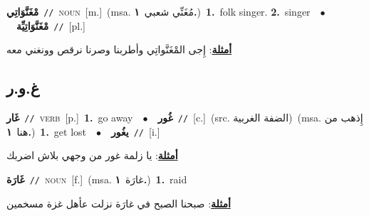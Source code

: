 \documentclass[10pt,a4paper,twoside]{article} %
\begin{document}
\begin{multicols}{2}
{\setlength\topsep{0pt}\textbf{\foreignlanguage{arabic}{مْغَنَّوَاتِي}}\ {\color{gray}\texttt{//}\color{black}}\ \textsc{noun}\ [m.]\ \color{gray}(msa. \foreignlanguage{arabic}{مُغَنِّي شعبي}~\foreignlanguage{arabic}{\textbf{١.}})\color{black}\ \textbf{1.}~folk singer.  \textbf{2.}~singer\ \ $\bullet$\ \ \setlength\topsep{0pt}\textbf{\foreignlanguage{arabic}{مْغَنَّوَاتِيِّة}}\ {\color{gray}\texttt{//}\color{black}}\ [pl.]\  \begin{flushright}\color{gray}\foreignlanguage{arabic}{\textbf{\underline{\foreignlanguage{arabic}{أمثلة}}}: إِجى المْغَنَّواتِي وأطربنا وصرنا نرقص وونغني معه}\end{flushright}\color{black}} \vspace{2mm}

\vspace{-3mm}
\subsection*{\color{blue}\foreignlanguage{arabic}{غ.و.ر}\color{blue}{}} 

{\setlength\topsep{0pt}\textbf{\foreignlanguage{arabic}{غَار}}\ {\color{gray}\texttt{//}\color{black}}\ \textsc{verb}\ [p.]\ \textbf{1.}~go away\ \ $\bullet$\ \ \setlength\topsep{0pt}\textbf{\foreignlanguage{arabic}{غُور}}\ {\color{gray}\texttt{//}\color{black}}\ [c.]\ (src. \color{gray}\foreignlanguage{arabic}{الضفة الغربية}\color{black})\ \color{gray}(msa. \foreignlanguage{arabic}{إِذهب من هنا}~\foreignlanguage{arabic}{\textbf{١.}})\color{black}\ \textbf{1.}~get lost\ \ $\bullet$\ \ \setlength\topsep{0pt}\textbf{\foreignlanguage{arabic}{يغُور}}\ {\color{gray}\texttt{//}\color{black}}\ [i.]\  \begin{flushright}\color{gray}\foreignlanguage{arabic}{\textbf{\underline{\foreignlanguage{arabic}{أمثلة}}}: يا زلمة غور من وجهي بلاش اضربك}\end{flushright}\color{black}} \vspace{2mm}

{\setlength\topsep{0pt}\textbf{\foreignlanguage{arabic}{غَارَة}}\ {\color{gray}\texttt{//}\color{black}}\ \textsc{noun}\ [f.]\ \color{gray}(msa. \foreignlanguage{arabic}{غارَة}~\foreignlanguage{arabic}{\textbf{١.}})\color{black}\ \textbf{1.}~raid\  \begin{flushright}\color{gray}\foreignlanguage{arabic}{\textbf{\underline{\foreignlanguage{arabic}{أمثلة}}}: صبحنا الصبح في غارَة نزلت عأهل غزة مسخمين}\end{flushright}\color{black}} \vspace{2mm}


\end{multicols}
\end{document}

